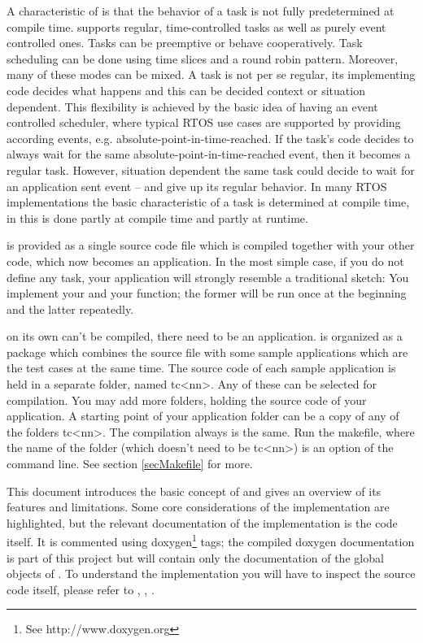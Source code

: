 A characteristic of \rtos{} is that the behavior of a task is not fully
predetermined at compile time. \rtos{} supports regular, time-controlled
tasks as well as purely event controlled ones. Tasks can be preemptive or
behave cooperatively. Task scheduling can be done using time slices and a
round robin pattern. Moreover, many of these modes can be mixed. A task is
not per se regular, its implementing code decides what happens and this
can be decided context or situation dependent. This flexibility is
achieved by the basic idea of having an event controlled scheduler, where
typical RTOS use cases are supported by providing according events, e.g.
absolute-point-in-time-reached. If the task's code decides to always wait
for the same absolute-point-in-time-reached event, then it becomes a
regular task. However, situation dependent the same task could decide to
wait for an application sent event -- and give up its regular behavior. In
many RTOS implementations the basic characteristic of a task is determined
at compile time, in \rtos{} this is done partly at compile time and partly
at runtime.

\rtos{} is provided as a single source code file which is compiled together
with your other code, which now becomes an \rtos{} application. In the most
simple case, if you do not define any task, your application will strongly
resemble a traditional sketch: You implement your  and your
 function; the former will be run once at the beginning and
the latter repeatedly.

\rtos{} on its own can't be compiled, there need to be an application.
\rtos{} is organized as a package which combines the \rtos{} source file
with some sample applications which are the test cases at the same time.
The source code of each sample application is held in a separate folder,
named tc\textless nn\textgreater. Any of these can be selected for
compilation. You may add more folders, holding the source code of your
\rtos{} application. A starting point of your application folder can be a
copy of any of the folders tc\textless nn\textgreater. The compilation
always is the same. Run the makefile, where the name of the folder (which
doesn't need to be tc\textless nn\textgreater) is an option of the
command line. See section \ref{secMakefile} for more.

This document introduces the basic concept of \rtos{} and gives an
overview of its features and limitations. Some core considerations of the
implementation are highlighted, but the relevant documentation of the
implementation is the code itself. It is commented using
doxygen\footnote{See http://www.doxygen.org} tags; the compiled doxygen
documentation is part of this project but will contain only the
documentation of the global objects of \rtos. To understand the
implementation you will have to inspect the source code itself, please
refer to , , .


